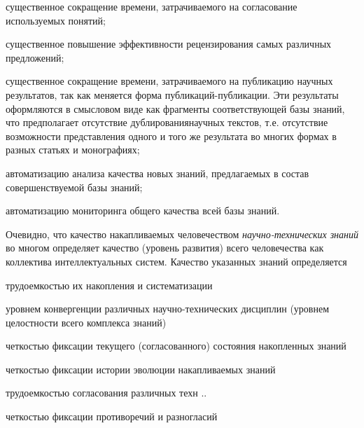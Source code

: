 \begin{scnsubstruct}
{        \begin{scnitemize}
            \item существенное сокращение времени, затрачиваемого на согласование используемых понятий;
            \item существенное повышение эффективности рецензирования самых различных предложений;
            \item существенное сокращение времени, затрачиваемого на публикацию научных результатов, так как меняется форма публикаций-публикации. Эти результаты оформляются в смысловом виде как фрагменты соответствующей базы знаний, что предполагает отсутствие дублированиянаучных текстов, т.е. отсутствие возможности представления одного и того же результата во многих формах в разных статьях и монографиях;
            \item автоматизацию анализа качества новых знаний, предлагаемых в состав совершенствуемой базы знаний;
            \item автоматизацию мониторинга общего качества всей базы знаний.
        \end{scnitemize}
        Очевидно, что качество накапливаемых человечеством \textit{научно-технических знаний} во многом определяет качество (уровень развития) всего человечества как коллектива интеллектуальных систем. Качество указанных знаний определяется
        \begin{scnitemize}
            \item трудоемкостью их накопления и систематизации
            \item уровнем конвергенции различных научно-технических дисциплин (уровнем целостности всего комплекса знаний)
            \item четкостью фиксации текущего (согласованного) состояния накопленных знаний
            \item четкостью фиксации истории эволюции накапливаемых знаний
            \item трудоемкостью согласования различных техн ..
            \item четкостью фиксации противоречий и разногласий
        \end{scnitemize}}
    

\end{scnsubstruct}
